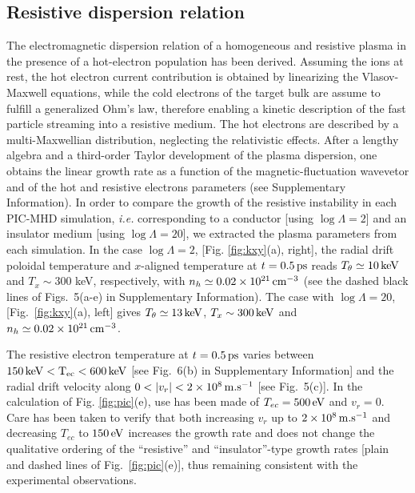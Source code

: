 \documentclass[aps,twocolumn,showpacs,superscriptaddress]{revtex4}
\begin{document}
\subsection*{ Resistive dispersion relation}
The electromagnetic dispersion relation of a homogeneous and resistive plasma in the presence of a hot-electron population has been derived. 
Assuming the ions at rest,  the hot electron current contribution is obtained by linearizing the Vlasov-Maxwell equations, while the cold electrons  of the target bulk are assume to fulfill a generalized Ohm's law, therefore enabling a kinetic description of the fast particle streaming into a resistive medium.
The  hot electrons are described by a  multi-Maxwellian distribution, neglecting the relativistic effects.
After a lengthy algebra and  a third-order Taylor development of the plasma dispersion, one obtains the linear growth rate as a function of the magnetic-fluctuation wavevetor and of the hot and resistive electrons parameters  (see Supplementary Information).
In order to compare the growth of the resistive instability in each PIC-MHD simulation, \emph{i.e.} corresponding to a conductor  [using $\log \Lambda=2$] and  an insulator medium [using $\log \Lambda=20$], we  extracted the plasma parameters from each simulation. 
In the case $\log \Lambda=2$, [Fig. \ref{fig:kxy}(a), right], the radial drift  poloidal temperature and $x$-aligned temperature at $t=0.5\,\rm ps$ reads
$T_\theta \simeq 10\,\rm keV$ and 
$T_x \sim 300$ keV, respectively, with $n_h\simeq 0.02 \times 10^{21}\,\rm cm^{-3}$ (see the dashed black lines of Figs.~5(a-e) in Supplementary Information). The case with $\log \Lambda =20$, [Fig.~\ref{fig:kxy}(a), left] gives $T_\theta \simeq 13\,\rm keV$,
$T_x \sim 300\,\rm keV$ and $n_h\simeq 0.02 \times 10^{21}\,\rm cm^{-3}$. 

The resistive electron temperature at $t=0.5\,\rm ps$ varies between $150\,\rm keV <T_{ec} < 600\,\rm keV$ [see Fig.~6(b) in Supplementary Information] and the radial drift velocity along $0< \vert v_r \vert <2\times 10^8 \,\rm m.s^{-1}$ [see Fig.~5(c)]. 
In the calculation of Fig. \ref{fig:pic}(e), use has been made of $T_{ec}=500\,\rm eV$ and $v_r = 0$.
Care has been taken to verify that both increasing $v_r$ up to $2\times 10^8 \,\rm m.s^{-1}$ and decreasing $T_{ec}$ to $150\,\rm eV$ increases the growth rate and does not change the qualitative ordering of the ``resistive'' and ``insulator''-type growth rates [plain and dashed lines of Fig.~\ref{fig:pic}(e)], thus remaining consistent with the experimental observations.
\end{document}

